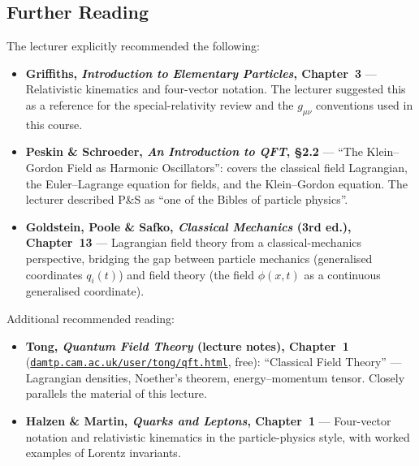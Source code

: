 \subsection*{Further Reading}

The lecturer explicitly recommended the following:

\begin{itemize}
  \item \textbf{Griffiths, \textit{Introduction to Elementary Particles}, Chapter~3}
    — Relativistic kinematics and four-vector notation.  The lecturer suggested
    this as a reference for the special-relativity review and the $g_{\mu\nu}$
    conventions used in this course.

  \item \textbf{Peskin \& Schroeder, \textit{An Introduction to QFT}, \S2.2}
    — ``The Klein--Gordon Field as Harmonic Oscillators'': covers the classical
    field Lagrangian, the Euler--Lagrange equation for fields, and the
    Klein--Gordon equation.  The lecturer described P\&S as ``one of the Bibles
    of particle physics''.

  \item \textbf{Goldstein, Poole \& Safko, \textit{Classical Mechanics} (3rd ed.),
    Chapter~13} — Lagrangian field theory from a classical-mechanics perspective,
    bridging the gap between particle mechanics (generalised coordinates $q_i(t)$)
    and field theory (the field $\phi(x,t)$ as a continuous generalised coordinate).
\end{itemize}

Additional recommended reading:

\begin{itemize}
  \item \textbf{Tong, \textit{Quantum Field Theory} (lecture notes), Chapter~1}
    (\href{https://www.damtp.cam.ac.uk/user/tong/qft.html}{\texttt{damtp.cam.ac.uk/user/tong/qft.html}},
    free): ``Classical Field Theory'' — Lagrangian densities, Noether's theorem,
    energy--momentum tensor.  Closely parallels the material of this lecture.

  \item \textbf{Halzen \& Martin, \textit{Quarks and Leptons}, Chapter~1}
    — Four-vector notation and relativistic kinematics in the particle-physics
    style, with worked examples of Lorentz invariants.
\end{itemize}
